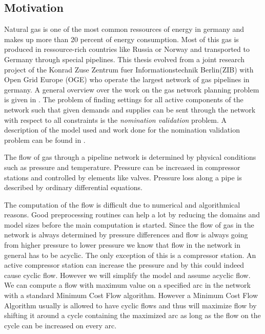\subsection{Motivation}
Natural gas is one of the most common ressources of energy in germany and makes up more than 20 percent of energy 
consumption. Most of this gas is produced in ressource-rich countries like Russia or Norway and transported to Germany 
through special pipelines. 
This thesis evolved from a joint research project of the Konrad Zuse Zentrum fuer Informationstechnik Berlin(ZIB) with 
Open Grid Europe (OGE) who operate the largest network of gas pipelines in germany. 
A general overview over the work on the gas network planning problem is given in 
\cite{FuegenschuhGeisslerGollmeretal.2013}. The problem of finding settings for all active components of the network 
such that given demands and supplies can be sent through the network with respect to all constraints is the 
\textit{nomination validation} problem. A description of the model used and work done for the nomination validation 
problem can be found in \cite{PfetschFuegenschuhGeissleretal.2012}. 

The flow of gas through a pipeline network is determined by physical conditions such as pressure and temperature. 
Pressure can be increased in compressor stations and controlled by elements like valves. Pressure loss along a pipe is 
described by ordinary differential equations. 

The computation of the flow is difficult due to numerical and algorithmical reasons. Good preprocessing 
routines can help a lot by reducing the domains and model sizes before the main computation is started.
Since the flow of gas in the network is always determined by pressure differences and flow is always going from higher 
pressure to lower pressure we know that flow in the network in general has to be acyclic. The only exception of this 
is a compressor station. An active compressor station can increase the pressure and by this could indeed cause cyclic 
flow. However we will simplify the model and assume acyclic flow. 
We can compute a flow with 
maximum value on a specified arc in the network with a standard Minimum Cost Flow algorithm. 
However a Minimum Cost Flow Algorithm usually is allowed to have cyclic flows and thus will maximize flow by shifting 
it around a cycle containing the maximized arc as long as the flow on the cycle can be increased on every arc. 


